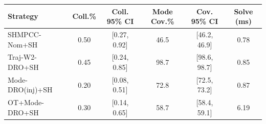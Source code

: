 \begin{tabular}{l c c c c c}
\toprule
Strategy & Coll.\% & Coll. 95\% CI & Mode Cov.\% & Cov. 95\% CI & Solve (ms) \\
\midrule
SHMPCC{-}Nom{+}SH & 0.50 & [0.27, 0.92] & 46.5 & [46.2, 46.9] & 0.78 \\
Traj{-}W2{-}DRO{+}SH & 0.45 & [0.24, 0.85] & 98.7 & [98.6, 98.7] & 0.85 \\
Mode{-}DRO(inj){+}SH & 0.20 & [0.08, 0.51] & 72.8 & [72.5, 73.2] & 0.87 \\
OT{+}Mode{-}DRO{+}SH & 0.30 & [0.14, 0.65] & 58.7 & [58.4, 59.1] & 6.19 \\
\bottomrule
\end{tabular}
